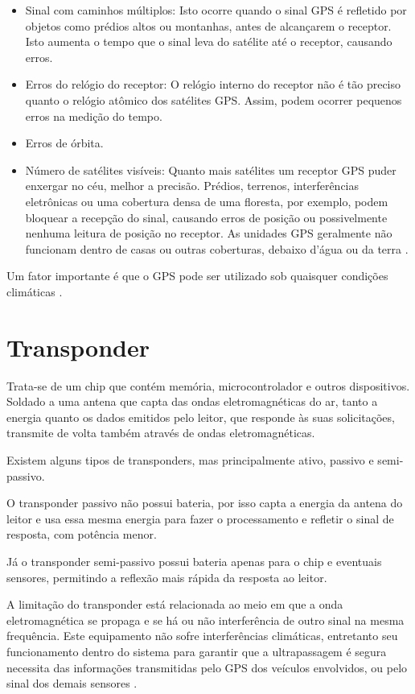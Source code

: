\begin{itemize}
  \item Sinal com caminhos múltiplos: Isto ocorre quando o sinal GPS é refletido por objetos como prédios altos ou montanhas, antes de alcançarem o receptor. Isto aumenta o tempo que o sinal leva do satélite até o receptor, causando erros.
  \item Erros do relógio do receptor: O relógio interno do receptor não é tão preciso quanto o relógio atômico dos satélites GPS. Assim, podem ocorrer pequenos erros na medição do tempo.
  \item Erros de órbita.
  \item Número de satélites visíveis: Quanto mais satélites um receptor GPS puder enxergar no céu, melhor a precisão. Prédios, terrenos, interferências eletrônicas ou uma cobertura densa de uma floresta, por exemplo, podem bloquear a recepção do sinal, causando erros de posição ou possivelmente nenhuma leitura de posição no receptor. As unidades GPS geralmente não funcionam dentro de casas ou outras coberturas, debaixo d'água ou da terra \cite{gps}.
\end{itemize}

Um fator importante é que o GPS pode ser utilizado sob quaisquer condições climáticas \cite{gps2}.

\section{Transponder }

Trata-se de um chip que contém memória, microcontrolador e outros dispositivos. Soldado a uma antena que capta das ondas eletromagnéticas do ar, tanto a energia quanto os dados emitidos pelo leitor, que responde às suas solicitações, transmite de volta também através de ondas eletromagnéticas.

Existem alguns tipos de transponders, mas principalmente ativo, passivo e semi-passivo.

O transponder passivo não possui bateria, por isso capta a energia da antena do leitor e usa essa mesma energia para fazer o processamento e refletir o sinal de resposta, com potência menor.

Já o transponder semi-passivo possui bateria apenas para o chip e eventuais sensores, permitindo a reflexão mais rápida da resposta ao leitor.

A limitação do transponder está relacionada ao meio em que a onda eletromagnética se propaga e se há ou não interferência de outro sinal na mesma frequência. Este equipamento não sofre interferências climáticas, entretanto seu funcionamento dentro do sistema para garantir que a ultrapassagem é segura necessita das informações transmitidas pelo GPS dos veículos envolvidos, ou pelo sinal dos demais sensores \cite{transponder}.

